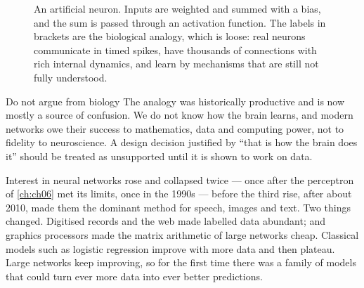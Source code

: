 \begin{figure}[htbp]
  \centering
  \caption{An artificial neuron. Inputs are weighted and summed with a bias, and
  the sum is passed through an activation function. The labels in brackets are
  the biological analogy, which is loose: real neurons communicate in timed
  spikes, have thousands of connections with rich internal dynamics, and learn
  by mechanisms that are still not fully understood.}
  \label{fig:neuron}
\end{figure}

\begin{pitfall}{Do not argue from biology}
The analogy was historically productive and is now mostly a source of confusion.
We do not know how the brain learns, and modern networks owe their success to
mathematics, data and computing power, not to fidelity to neuroscience. A design
decision justified by ``that is how the brain does it'' should be treated as
unsupported until it is shown to work on data.
\end{pitfall}

Interest in neural networks rose and collapsed twice --- once after the
perceptron of \cref{ch:ch06} met its limits, once in the 1990s --- before the
third rise, after about 2010, made them the dominant method for speech, images
and text. Two things changed. Digitised records and the web made labelled data
abundant; and graphics processors made the matrix arithmetic of large networks
cheap. Classical models such as logistic regression improve with more data and
then plateau. Large networks keep improving, so for the first time there was a
family of models that could turn ever more data into ever better predictions.

